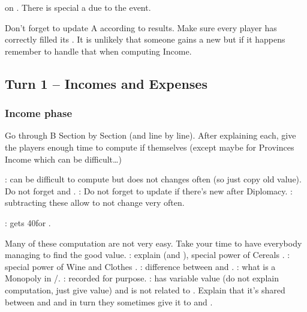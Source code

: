 \aparag \FRA on \paysToscane.
\bparag There is special a  due to the event.

\aparag Don't forget to update \EcoRS A according to results. Make sure every
player has correctly filled its .
\bparag It is unlikely that someone gains a new \VASSAL but if it happens
remember to handle that when computing Income.

\subsection{Turn 1 -- Incomes and Expenses}
\subsubsection{Income phase}
\aparag Go through \EcoRS B Section by Section (and line by line). After
explaining each, give the players enough time to compute if themselves (except
maybe for Provinces Income which can be difficult\ldots)

\bparag {}: can be difficult to compute but
does not changes often (so just copy old value). Do not forget \provinceAcores
and .
\bparag {}: Do not forget to update if
there's new \VASSAL after Diplomacy.
\bparag {}: subtracting these
allow to not change  very often.

\bparag {}: \POR gets 40\ducats for
.

 Many of these computation are not very easy. Take your
time to have everybody managing to find the good value.
\bparag {}: explain \DTI (and \FTI),
special power of Cereals \MNU.
\bparag {}: special power of Wine and
Clothes \MNU.
\bparag {}: difference between \STZ and
\CTZ.
\bparag {}: what is a Monopoly in
\STZ/\CTZ.
\bparag {}: recorded for \VPs
purpose.
\bparag {}:  has variable
value (do not explain computation, just give value) and is not related to
\TradeFLEET. Explain that it's shared between \paysEgypte and \paysDamas and
in turn they sometimes give it to \VEN and \TUR.


